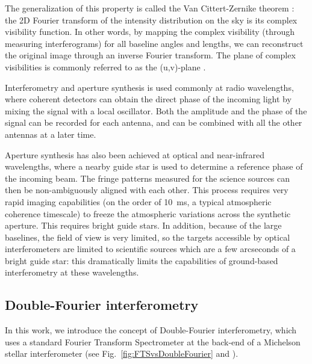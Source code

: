 The generalization of this property is called the Van Cittert-Zernike theorem \citep{Zernike:1938kq}: the 2D Fourier transform of the intensity distribution on the sky is its complex visibility function. In other words, by mapping the complex visibility (through measuring interferograms) for all baseline angles and lengths, we can reconstruct the original image through an inverse Fourier transform. The plane of complex visibilities is commonly referred to as the (u,v)-plane \citep{Thompson:2008ww}.

Interferometry and aperture synthesis is used commonly at radio wavelengths, where coherent detectors can obtain the direct phase of the incoming light by mixing the signal with a local oscillator. Both the amplitude and the phase of the signal can be recorded for each antenna, and can be combined with all the other antennas at a later time.

Aperture synthesis has also been achieved at optical and near-infrared wavelengths, where a nearby guide star is used to determine a reference phase of the incoming beam. The fringe patterns measured for the science sources can then be non-ambiguously aligned with each other. This process requires very rapid imaging capabilities (on the order of \SI{10}{\milli\second}, a typical atmospheric coherence timescale) to freeze the atmospheric variations across the synthetic aperture. This requires bright guide stars. In addition, because of the large baselines, the field of view is very limited, so the targets accessible by optical interferometers are limited to scientific sources which are a few arcseconds of a bright guide star: this dramatically limits the capabilities of ground-based interferometry at these wavelengths.


\subsection{Double-Fourier interferometry}


In this work, we introduce the concept of Double-Fourier interferometry, which uses a standard Fourier Transform Spectrometer at the back-end of a Michelson stellar interferometer (see Fig.~\ref{fig:FTSvsDoubleFourier} and \citet{Mariotti:1988vea}). 


